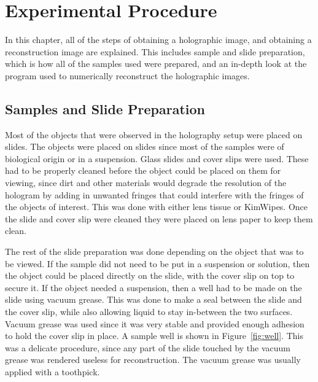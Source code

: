 %
%
%

\chapter{Experimental Procedure} \label{chap:Experimental}

In this chapter, all of the steps of obtaining a holographic image, and obtaining
a reconstruction image are explained. This includes sample and slide
preparation, which is how all of the samples used were prepared, and
an in-depth look at the program used to numerically reconstruct the holographic
images.

\section{Samples and Slide Preparation}

Most of the objects that were observed in the holography setup were placed on slides. 
%
%
The objects were placed on slides
since most of the samples were of biological origin or in a suspension. Glass slides and
cover slips were used. These had to be properly cleaned before the object could
be placed on them for viewing, since dirt and other materials would degrade the
resolution of the hologram by adding in unwanted fringes that could interfere
with the fringes of the objects of interest. This was done with either lens tissue or KimWipes.
Once the slide and cover slip were cleaned they
were placed on lens paper to keep them clean.

The rest of the slide preparation was done depending on the object that was to be
viewed. If the sample did not need to be put in a suspension or solution, then
the object could be placed directly on the slide, with the cover slip on top to
secure it.
If the object needed a suspension, then a well had to be made on the slide
using vacuum grease.
This was done to make a seal between the
slide and the cover slip, while also allowing liquid to stay in-between the two
surfaces. Vacuum grease was used since it was very stable and provided enough
adhesion to hold the cover slip in place.
A sample well is shown in Figure~\ref{fig:well}.
This was a delicate procedure, since any part of the slide touched by the
vacuum grease was rendered useless for reconstruction. The vacuum
grease was usually applied with a toothpick.

